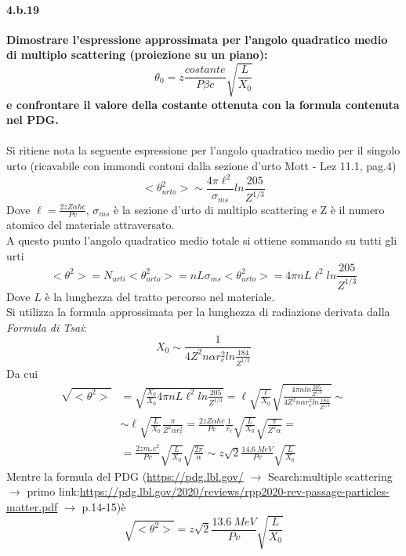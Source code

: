 \documentclass[twoside]{article}
\begin{document}
\paragraph{4.b.19}\textbf{Dimostrare l'espressione approssimata per l’angolo quadratico medio di multiplo scattering (proiezione su un piano):
\begin{equation}
    \theta_0=z\frac{costante}{P\beta c}\sqrt{\frac{L}{X_0}}
\end{equation}
e confrontare il valore della
costante ottenuta con la formula contenuta nel PDG.} \\ \\

Si ritiene nota la seguente espressione per l'angolo quadratico medio per il singolo urto (ricavabile con immondi contoni dalla sezione d'urto Mott - Lez 11.1, pag.4)
\begin{equation}
    <\theta^2_{urto}>\sim \frac{4\pi \ell^2}{\sigma_{ms}}ln\frac{205}{Z^{1/3}}
\end{equation}
Dove $\ell=\frac{2zZ\alpha \hbar c}{Pv}$, $\sigma_{ms}$ è la sezione d'urto di multiplo scattering e Z è il numero atomico del materiale attraversato.
\\
A questo punto l'angolo quadratico medio totale si ottiene sommando su tutti gli urti
\begin{equation}
    <\theta^2>=N_{urti}<\theta^2_{urto}>=nL\sigma_{ms} <\theta^2_{urto}>=4\pi nL\ell^2 ln \frac{205}{Z^{1/3}}
\end{equation}
Dove $L$ è la lunghezza del tratto percorso nel materiale.
\\
Si utilizza la formula approssimata per la lunghezza di radiazione derivata dalla \textit{Formula di Tsai}:
\begin{equation}
    X_0\sim \frac{1}{4Z^2n\alpha r_e^2 ln \frac{184}{Z^{1/3}}}
\end{equation}
Da cui
\begin{align}
    \sqrt{<\theta^2>}&=\sqrt{\frac{X_0}{X_0}4\pi nL\ell^2 ln \frac{205}{Z^{1/3}}}=\ell\sqrt{\frac{\ell}{X_0}}\sqrt{\frac{4\pi n ln\frac{205}{Z^{1/3}}}{4Z^2 n\alpha r_e^2 ln\frac{184}{Z^{1/3}}}}\sim \\
    &\sim \ell \sqrt{\frac{L}{X_0}}\frac{\pi}{Z^2 \alpha r_e^2}=\frac{2zZ\alpha \hbar c}{Pv}\frac{1}{r_e}\sqrt{\frac{L}{X_0}}\sqrt{\frac{\pi}{Z^2 \alpha}}=\\
    &=\frac{2zm_ec^2}{Pv}\sqrt{\frac{L}{X_0}}\sqrt{\frac{2\pi}{\alpha}}\sim z\sqrt{2}\frac{14.6 \ MeV}{Pv}\sqrt{\frac{L}{X_0}}
\end{align}
Mentre la formula del PDG (\url{https://pdg.lbl.gov/} $\rightarrow$ Search:multiple scattering $\rightarrow$ primo link:\url{https://pdg.lbl.gov/2020/reviews/rpp2020-rev-passage-particles-matter.pdf} $\rightarrow$ p.14-15)è
\begin{equation}
    \sqrt{<\theta^2>}=z\sqrt{2}\frac{13.6 \ MeV}{Pv}\sqrt{\frac{L}{X_0}}
\end{equation}
\end{document}
